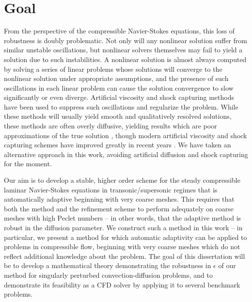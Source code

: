 \section{Goal}

From the perspective of the compressible Navier-Stokes equations, this loss of robustness is doubly problematic.  Not only will any nonlinear solution suffer from similar unstable oscillations, but nonlinear solvers themselves may fail to yield a solution due to such instabilities.  A nonlinear solution is almost always computed by solving a series of linear problems whose solutions will converge to the nonlinear solution under appropriate assumptions, and the presence of such oscillations in each linear problem can cause the solution convergence to slow significantly or even diverge.  Artificial viscosity and shock capturing methods have been used to suppress such oscillations and regularize the problem.  While these methods will usually yield smooth and qualitatively resolved solutions, these methods are often overly diffusive, yielding results which are poor approximations of the true solution \cite{Gresho1981223}, though modern artificial viscosity and shock capturing schemes have improved greatly in recent years \cite{Barter,Guermond20114248}.  We have taken an alternative approach in this work, avoiding artificial diffusion and shock capturing for the moment.  

Our aim is to develop a stable, higher order scheme for the steady compressible laminar Navier-Stokes equations in transonic/supersonic regimes that is automatically adaptive beginning with very coarse meshes.  This requires that both the method and the refinement scheme to perform adequately on coarse meshes with high Peclet numbers -- in other words, that the adaptive method is robust in the diffusion parameter.  We construct such a method in this work -- in particular, we present a method for which automatic adaptivity can be applied to problems in compressible flow, beginning with very coarse meshes which do not reflect additional knowledge about the problem.  The goal of this dissertation will be to develop a mathematical theory demonstrating the robustness in $\epsilon$ of our method for singularly perturbed convection-diffusion problems, and to demonstrate its feasibility as a CFD solver by applying it to several benchmark problems.  


